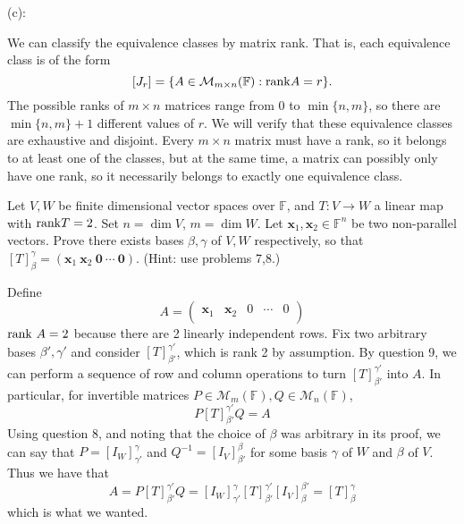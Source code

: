 \documentclass{eh-homework}
\begin{document}
\begin{question}{9}
        \medskip

        (c):

        We can classify the equivalence classes by matrix rank. That is, each equivalence class is of the form
        \[
            [J_r] = \{ A \in \mathcal{M} _{m\times n}(\mathbb{F}) : \mathrm{rank} A = r\}.
        \]
        The possible ranks of \(m\times n\) matrices range from \(0\) to \(\min \{ n,m \}\), so there are \(\min \{ n,m \} + 1\) different values of \(r\). We will verify that these equivalence classes are exhaustive and disjoint. Every \(m \times n\) matrix must have a rank, so it belongs to at least one of the classes, but at the same time, a matrix can possibly only have one rank, so it necessarily belongs to exactly one equivalence class.
    \end{question}

    \begin{question}{10}
        Let \( V, W \) be finite dimensional vector spaces over \( \mathbb{F} \), and \( T : V \to W \) a linear map with \(\mathrm{rank} T = 2\). Set \( n = \dim V \), \( m = \dim W \). Let \( \mathbf{x}_1, \mathbf{x}_2 \in \mathbb{F}^n \) be two non-parallel vectors. Prove there exists bases \( \beta, \gamma \) of \( V, W \) respectively, so that \( [T]_\beta^\gamma = (\mathbf{x}_1 \ \mathbf{x}_2 \ \mathbf{0} \ \cdots \ \mathbf{0}) \). (Hint: use problems 7,8.)

        \tcblower

        Define
        \[
            A = \begin{pmatrix}
                \mathbf{x}_1 & \mathbf{x}_2 & 0 & \cdots &  0 \\
            \end{pmatrix}
        \]
        \(\mathrm{rank} \ A = 2\) because there are 2 linearly independent rows. Fix two arbitrary bases \(\beta', \gamma'\) and consider \([T]_{\beta'}^{\gamma'}\), which is rank 2 by assumption. By question 9, we can perform a sequence of row and column operations to turn \([T]_{\beta'}^{\gamma'}\) into \(A\). In particular, for invertible matrices \(P \in \mathcal{M} _m(\mathbb{F}), Q \in \mathcal{M} _n(\mathbb{F})\),
        \[
            P [T]_{\beta'}^{\gamma'} Q = A
        \]
        Using question 8, and noting that the choice of \(\beta\) was arbitrary in its proof, we can say that \(P = [I_W]_{\gamma'}^\gamma\) and \(Q^{-1} = [I_V]_{\beta'}^\beta\) for some basis \(\gamma\) of \(W\) and \(\beta\) of \(V\). Thus we have that
        \[
            A = P [T]_{\beta'}^{\gamma'} Q = [I_W]_{\gamma'}^\gamma [T]_{\beta'}^{\gamma'} [I_V]_{\beta}^{\beta'} = [T]_\beta^\gamma
        \]
        which is what we wanted.
    \end{question}
\end{document}
